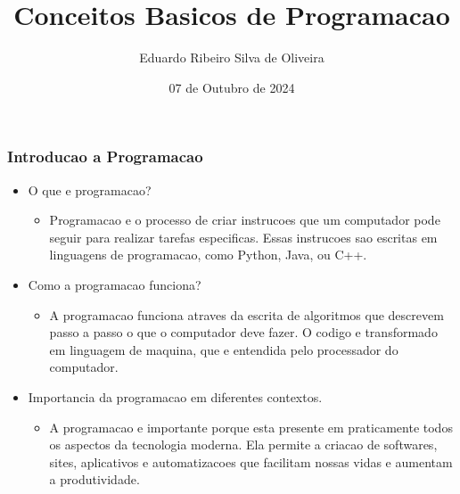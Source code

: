 \documentclass{beamer}
\title{Conceitos Basicos de Programacao}
\author{Eduardo Ribeiro Silva de Oliveira}
\date{07 de Outubro de 2024}
\begin{document}
\frame{\titlepage}

\begin{frame}
  \frametitle{Introducao a Programacao}
  \begin{itemize}
    \item O que e programacao?
    \begin{itemize}
      \item Programacao e o processo de criar instrucoes que um computador pode seguir para realizar tarefas especificas. Essas instrucoes sao escritas em linguagens de programacao, como Python, Java, ou C++.
    \end{itemize}
    \item Como a programacao funciona?
    \begin{itemize}
      \item A programacao funciona atraves da escrita de algoritmos que descrevem passo a passo o que o computador deve fazer. O codigo e transformado em linguagem de maquina, que e entendida pelo processador do computador.
    \end{itemize}
    \item Importancia da programacao em diferentes contextos.
    \begin{itemize}
      \item A programacao e importante porque esta presente em praticamente todos os aspectos da tecnologia moderna. Ela permite a criacao de softwares, sites, aplicativos e automatizacoes que facilitam nossas vidas e aumentam a produtividade.
    \end{itemize}
  \end{itemize}
\end{frame}
\end{document}
